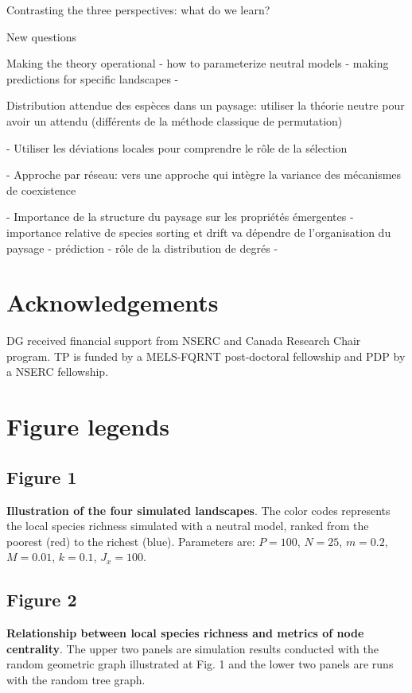 \documentclass[12pt]{article}
\begin{document}
Contrasting the three perspectives: what do we learn?

New questions

Making the theory operational
	- how to parameterize neutral models
	- making predictions for specific landscapes
	- 


Distribution attendue des espèces dans un paysage: utiliser la théorie neutre pour avoir un attendu (différents de la méthode classique de permutation)

- Utiliser les déviations locales pour comprendre le rôle de la sélection 

- Approche par réseau: vers une approche qui intègre la variance des mécanismes de coexistence

- Importance de la structure du paysage sur les propriétés émergentes
	- importance relative de species sorting et drift va dépendre de l'organisation du paysage
	- prédiction
	- rôle de la distribution de degrés
- 

\section{Acknowledgements}
DG received financial support from NSERC and Canada Research Chair program. TP is funded by a MELS-FQRNT post-doctoral fellowship and PDP by a NSERC fellowship.
\newpage

\printbibliography

\newpage
\section*{Figure legends}

\subsection*{Figure 1}
\textbf{Illustration of the four simulated landscapes}. The color codes represents the local species richness simulated with a neutral model, ranked from the poorest (red) to the richest (blue). Parameters are: $P = 100$, $N = 25$, $m = 0.2$, $M = 0.01$, $k = 0.1$, $J_x = 100$.

\subsection*{Figure 2}
\textbf{Relationship between local species richness and metrics of node centrality}. The upper two panels are simulation results conducted with the random geometric graph illustrated at Fig. 1 and the lower two panels are runs with the random tree graph. 
\end{document}
